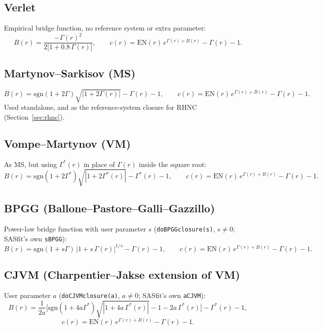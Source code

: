 \documentclass[11pt,a4paper]{article}
\newcommand{\code}[1]{\texttt{#1}}
\begin{document}
\subsection{Verlet \cite{verlet1980,verlet1981}}
Empirical bridge function, no reference system or extra parameter:
\begin{equation}
  B(r) = \frac{-\Gamma(r)^2}{2\big[1+0.8\,\Gamma(r)\big]}, \qquad
  c(r) = \mathrm{EN}(r)\,e^{\Gamma(r)+B(r)} - \Gamma(r) - 1.
\end{equation}

\subsection{Martynov--Sarkisov (MS) \cite{martynovsarkisov1983}}
\label{sec:ms}
\begin{equation}
  B(r) = \mathrm{sgn}(1{+}2\Gamma)\sqrt{|1+2\Gamma(r)|} - \Gamma(r) - 1, \qquad
  c(r) = \mathrm{EN}(r)\,e^{\Gamma(r)+B(r)} - \Gamma(r) - 1.
\end{equation}
Used standalone, and as the reference-system closure for RHNC
(Section~\ref{sec:rhnc}).

\subsection{Vompe--Martynov (VM) \cite{vompemartynov1994}}
As MS, but using $\Gamma^*(r)$ in place of $\Gamma(r)$ inside the square root:
\begin{equation}
  B(r) = \mathrm{sgn}(1{+}2\Gamma^*)\sqrt{|1+2\Gamma^*(r)|} - \Gamma^*(r) - 1, \qquad
  c(r) = \mathrm{EN}(r)\,e^{\Gamma(r)+B(r)} - \Gamma(r) - 1.
\end{equation}

\subsection{BPGG (Ballone--Pastore--Galli--Gazzillo) \cite{ballone1986}}
Power-law bridge function with user parameter $s$ (\code{doBPGGclosure(s)},
$s\ne0$; SASfit's own \code{sBPGG}):
\begin{equation}
  B(r) = \mathrm{sgn}(1{+}s\Gamma)\,|1+s\,\Gamma(r)|^{1/s} - \Gamma(r) - 1, \qquad
  c(r) = \mathrm{EN}(r)\,e^{\Gamma(r)+B(r)} - \Gamma(r) - 1.
\end{equation}

\subsection{CJVM (Charpentier--Jakse extension of VM) \cite{charpentierjakse2001,vompemartynov1994}}
User parameter $a$ (\code{doCJVMclosure(a)}, $a\ne0$; SASfit's own
\code{aCJVM}):
\begin{equation}
  B(r) = \frac{1}{2a}\Big[\mathrm{sgn}(1{+}4a\Gamma^*)\sqrt{|1+4a\,\Gamma^*(r)|} - 1 - 2a\,\Gamma^*(r)\Big] - \Gamma^*(r) - 1,
\end{equation}
\begin{equation}
  c(r) = \mathrm{EN}(r)\,e^{\Gamma(r)+B(r)} - \Gamma(r) - 1.
\end{equation}
\end{document}
